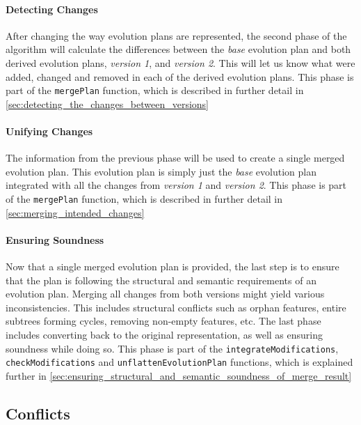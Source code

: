 \documentclass[a4paper,english]{ifimaster}
\begin{document}
\paragraph{Detecting Changes}%
\label{par:detecting_changes}

After changing the way evolution plans are represented, the second phase of the algorithm will calculate the differences between the \textit{base} evolution plan and both derived evolution plans, \textit{version 1}, and \textit{version 2}. This will let us know what were added, changed and removed in each of the derived evolution plans. This phase is part of the \texttt{mergePlan} function, which is described in further detail in \vref{sec:detecting_the_changes_between_versions}

\paragraph{Unifying Changes}%
\label{par:unifying_changes}

The information from the previous phase will be used to create a single merged evolution plan. This evolution plan is simply just the \textit{base} evolution plan integrated with all the changes from \textit{version 1} and \textit{version 2}. This phase is part of the \texttt{mergePlan} function, which is described in further detail in \vref{sec:merging_intended_changes}

\paragraph{Ensuring Soundness}%
\label{par:ensuring_soundness}

Now that a single merged evolution plan is provided, the last step is to ensure that the plan is following the structural and semantic requirements of an evolution plan. Merging all changes from both versions might yield various inconsistencies. This includes structural conflicts such as orphan features, entire subtrees forming cycles, removing non-empty features, etc. The last phase includes converting back to the original representation, as well as ensuring soundness while doing so. This phase is part of the \texttt{integrate\-Modifications}, \texttt{check\-Modifications} and \texttt{unflatten\-Evolution\-Plan} functions, which is explained further in \vref{sec:ensuring_structural_and_semantic_soundness_of_merge_result}

\subsection{Conflicts}%
\label{sub:conflicts}
\end{document}

